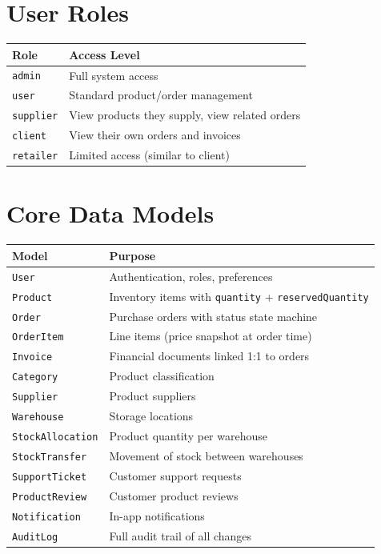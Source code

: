 \documentclass[12pt,a4paper]{report}
\begin{document}
\section{User Roles}

\begin{center}
\begin{tabular}{lp{10cm}}
  \toprule
  \textbf{Role} & \textbf{Access Level} \\
  \midrule
  \texttt{admin}    & Full system access \\
  \texttt{user}     & Standard product/order management \\
  \texttt{supplier} & View products they supply, view related orders \\
  \texttt{client}   & View their own orders and invoices \\
  \texttt{retailer} & Limited access (similar to client) \\
  \bottomrule
\end{tabular}
\end{center}

\section{Core Data Models}

\begin{center}
\begin{tabular}{ll}
  \toprule
  \textbf{Model} & \textbf{Purpose} \\
  \midrule
  \texttt{User}            & Authentication, roles, preferences \\
  \texttt{Product}         & Inventory items with \texttt{quantity} + \texttt{reservedQuantity} \\
  \texttt{Order}           & Purchase orders with status state machine \\
  \texttt{OrderItem}       & Line items (price snapshot at order time) \\
  \texttt{Invoice}         & Financial documents linked 1:1 to orders \\
  \texttt{Category}        & Product classification \\
  \texttt{Supplier}        & Product suppliers \\
  \texttt{Warehouse}       & Storage locations \\
  \texttt{StockAllocation} & Product quantity per warehouse \\
  \texttt{StockTransfer}   & Movement of stock between warehouses \\
  \texttt{SupportTicket}   & Customer support requests \\
  \texttt{ProductReview}   & Customer product reviews \\
  \texttt{Notification}    & In-app notifications \\
  \texttt{AuditLog}        & Full audit trail of all changes \\
  \bottomrule
\end{tabular}
\end{center}
\end{document}
